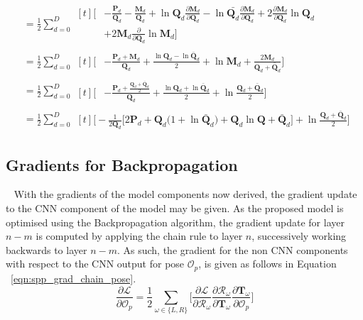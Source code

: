 \begin{align}
  {}&= \frac{1}{2} \sum_{d = 0}^{D}
  \begin{aligned}[t]
    \Bigg[ {}&
      -\frac{\bm{P}_{d}}{\bm{Q}_{d}}
      -\frac{\bm{M}_{d}}{\bm{Q}_{d}}
      +\ln{\bm{Q}_{d}} \frac{\partial \bm{M}_{d}}{\partial \bm{Q}_{d}}
      -\ln{\bar{\bm{Q}_{d}}} \frac{\partial \bm{M}_{d}}{\partial \bm{Q}_{d}}
      +2 \frac{\partial \bm{M}_{d}}{\partial \bm{Q}_{d}} \ln{\bm{Q}_{d}}\\
      {}&
      +2 \bm{M}_{d} \frac{\partial}{\partial \bm{Q}_{d}} \ln{\bm{M}_{d}}
    \Bigg]
  \end{aligned}\\
  {}&= \frac{1}{2} \sum_{d = 0}^{D}
  \begin{aligned}[t]
    \Bigg[ {}&
      -\frac{\bm{P}_{d} + \bm{M}_{d}}{\bm{Q}_{d}}
      +\frac{\ln{\bm{Q}_{d} - \ln{\bar{\bm{Q}}_{d}}}}{2}
      +\ln{\bm{M}_{d}} 
      +\frac{2\bm{M}_{d}}{\bm{Q}_{d} + \bar{\bm{Q}}_{d}}
    \Bigg]
  \end{aligned}\\
  {}&= \frac{1}{2} \sum_{d = 0}^{D}
  \begin{aligned}[t]
    \Bigg[ {}&
      -\frac{\bm{P}_{d} + \frac{\bm{Q}_{d} + \bar{\bm{Q}}_{d}}{2}}{\bm{Q}_{d}}
      +\frac{\ln{\bm{Q}_{d}} + \ln{\bar{\bm{Q}}_{d}}}{2}
      +\ln{\frac{\bm{Q}_{d} + \bar{\bm{Q}}_{d}}{2}}
    \Bigg]
  \end{aligned}\\
  {}&= \frac{1}{2} \sum_{d = 0}^{D}
  \begin{aligned}[t]
    \Bigg [
      -\frac{1}{2 \bm{Q}_{d}} \Bigg[
        2 \bm{P}_{d} + \bm{Q}_{d} \big( 1 + \ln{\bar{\bm{Q}}_{d}} \big)
        + \bm{Q}_{d} \ln{\bm{Q}}
        + \bar{\bm{Q}}_{d}
      \Bigg]
      +\ln{\frac{\bm{Q}_{d} + \bar{\bm{Q}}_{d}}{2}}
    \Bigg]
  \end{aligned}
\end{align}

\subsection{Gradients for Backpropagation}
~\label{subsec:spp_backprop}
With the gradients of the model components now derived, the gradient update to the CNN component 
of the model may be given. As the proposed model is optimised using the Backpropagation algorithm, 
the gradient update for layer \( n - m \) is computed by applying the chain rule to layer \( n \), 
successively working backwards to layer \( n - m \). As such, the gradient for the non CNN components 
with respect to the CNN output for pose \( \mathcal{O}_{p} \), is given as follows in Equation
~\ref{eqn:spp_grad_chain_pose}.
\begin{equation}
  \label{eqn:spp_grad_chain_pose}
  \frac{\partial \mathcal{L}}{\partial \mathcal{O}_{p}} = 
  \frac{1}{2} \sum_{\omega \in \{L, R\}} \Bigg[
    \frac{\partial \mathcal{L}}{\partial \mathcal{R}_{\omega}}
    \frac{\partial \mathcal{R}_{\omega}}{\partial \bm{T}_{\omega}}
    \frac{\partial \bm{T}_{\omega}}{\partial \mathcal{O}_{p}}
  \Bigg]
\end{equation}

